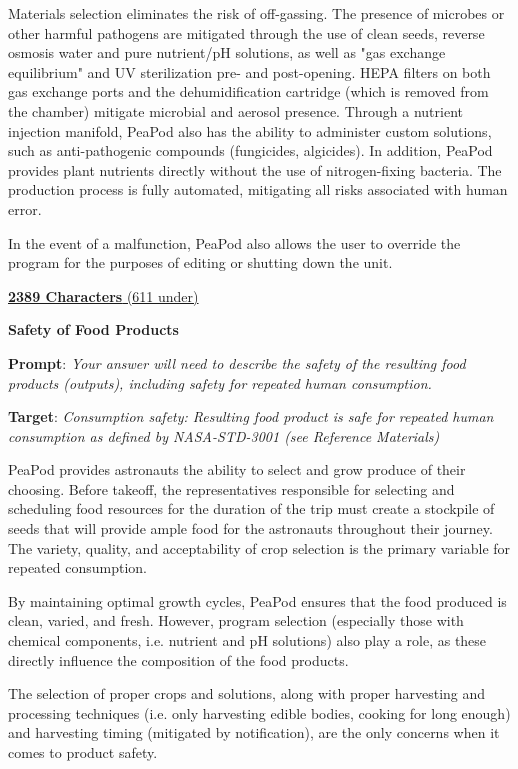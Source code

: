 \documentclass{report}
\begin{document}
Materials selection eliminates the risk of off-gassing. The presence of microbes or other harmful pathogens are mitigated through the use of clean seeds, reverse osmosis water and pure nutrient/pH solutions, as well as "gas exchange equilibrium" and UV sterilization pre- and post-opening. HEPA filters on both gas exchange ports and the dehumidification cartridge (which is removed from the chamber) mitigate microbial and aerosol presence. Through a nutrient injection manifold, PeaPod also has the ability to administer custom solutions, such as anti-pathogenic compounds (fungicides, algicides).
In addition, PeaPod provides plant nutrients directly without the use of nitrogen-fixing bacteria. The production process is fully automated, mitigating all risks associated with human error. 

In the event of a malfunction, PeaPod also allows the user to override the program for the purposes of editing or shutting down the unit.

\uline{\textbf{2389 Characters} (611 under)}

\textbf{Safety of Food Products}
\label{sec:safety-products}

\textbf{Prompt}: \textit{Your answer will need to describe the safety of the resulting food products (outputs), including safety for repeated human consumption.}

\textbf{Target}: \textit{Consumption safety: Resulting food product is safe for repeated human consumption as defined by NASA-STD-3001 (see Reference Materials)}


PeaPod provides astronauts the ability to select and grow produce of their choosing. Before takeoff, the representatives responsible for selecting and scheduling food resources for the duration of the trip must create a stockpile of seeds that will provide ample food for the astronauts throughout their journey. The variety, quality, and acceptability of crop selection is the primary variable for repeated consumption.

By maintaining optimal growth cycles, PeaPod ensures that the food produced is clean, varied, and fresh. However, program selection (especially those with chemical components, i.e. nutrient and pH solutions) also play a role, as these directly influence the composition of the food products.

The selection of proper crops and solutions, along with proper harvesting and processing techniques (i.e. only harvesting edible bodies, cooking for long enough) and harvesting timing (mitigated by notification), are the only concerns when it comes to product safety.
\end{document}
